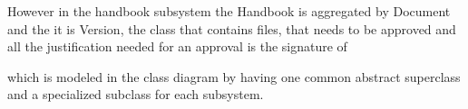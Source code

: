 However in the handbook subsystem the Handbook is aggregated by Document and the
it is Version, the class that contains files, that needs to be approved and all the justification needed for an approval is the signature of



 which is modeled in the class diagram by having one common abstract superclass and a specialized subclass for each subsystem.
